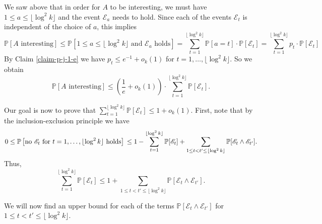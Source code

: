We saw above that in order for $A$ to be interesting, we must have $1\leq a\leq \lfloor\log^2 k\rfloor$ and the event $\mathscr{E}_a$ needs to hold. Since each of the events $\mathscr{E}_t$ is independent of the choice of $a$, this implies
\[\mathbb{P}\left[A\text{ interesting}\right]\leq \mathbb{P}\left[1\leq a\leq \lfloor\log^2 k\rfloor\text{ and }\mathscr{E}_a\text{ holds}\right]=\sum_{t=1}^{\lfloor\log^2 k\rfloor} \mathbb{P}[a=t]\cdot \mathbb{P}[\mathscr{E}_t]=\sum_{t=1}^{\lfloor\log^2 k\rfloor} p_t\cdot \mathbb{P}[\mathscr{E}_t]\]
By Claim \ref{claim-p-j-1-e} we have $p_t\leq e^{-1}+o_k(1)$ for $t=1, \dots, \lfloor\log^2 k\rfloor$. So we obtain
\begin{equation}\label{ineq-A-interesting-E-t}
\mathbb{P}\left[A\text{ interesting}\right]\leq \left(\frac{1}{e}+o_k(1)\right)\cdot \sum_{t=1}^{\lfloor\log^2 k\rfloor} \mathbb{P}[\mathscr{E}_t].
\end{equation}

Our goal is now to prove that $\sum_{t=1}^{\lfloor\log^2 k\rfloor} \mathbb{P}[\mathscr{E}_t]\leq 1+o_k(1)$. First, note that by the inclusion-exclusion principle we have
\[0\leq \mathbb{P}\left[\text{no }\mathscr{E}_t\text{ for }t=1, \dots, \lfloor\log^2 k\rfloor\text{ holds}\right]\\
\leq 1-\sum_{t=1}^{\lfloor\log^2 k\rfloor} \mathbb{P}[\mathscr{E}_t]+\sum_{1\leq t<t'\leq \lfloor\log^2 k\rfloor}\mathbb{P}[\mathscr{E}_t\wedge\mathscr{E}_{t'}].\]
Thus,
\begin{equation}\label{ineq-sum-e-t}
\sum_{t=1}^{\lfloor\log^2 k\rfloor} \mathbb{P}[\mathscr{E}_t]\leq 1+\sum_{1\leq t<t'\leq \lfloor\log^2 k\rfloor}\mathbb{P}[\mathscr{E}_t\wedge\mathscr{E}_{t'}].
\end{equation}

We will now find an upper bound for each of the terms $\mathbb{P}[\mathscr{E}_t\wedge\mathscr{E}_{t'}]$ for $1\leq t<t'\leq \lfloor\log^2 k\rfloor$.

